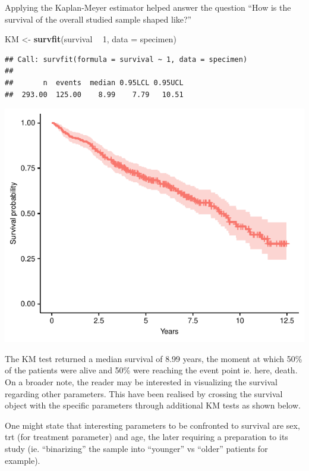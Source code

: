 \documentclass[]{article}
\newenvironment{Shaded}{\begin{snugshade}}{\end{snugshade}}
\newcommand{\KeywordTok}[1]{\textcolor[rgb]{0.13,0.29,0.53}{\textbf{#1}}}
\newcommand{\DataTypeTok}[1]{\textcolor[rgb]{0.13,0.29,0.53}{#1}}
\newcommand{\DecValTok}[1]{\textcolor[rgb]{0.00,0.00,0.81}{#1}}
\newcommand{\StringTok}[1]{\textcolor[rgb]{0.31,0.60,0.02}{#1}}
\newcommand{\OperatorTok}[1]{\textcolor[rgb]{0.81,0.36,0.00}{\textbf{#1}}}
\newcommand{\NormalTok}[1]{#1}
\begin{document}
Applying the Kaplan-Meyer estimator helped answer the question ``How is
the survival of the overall studied sample shaped like?''

\begin{Shaded}
\begin{Highlighting}[]
\NormalTok{KM <-}\StringTok{ }\KeywordTok{survfit}\NormalTok{(survival }\OperatorTok{~}\StringTok{ }\DecValTok{1}\NormalTok{, }\DataTypeTok{data =}\NormalTok{ specimen)}
\end{Highlighting}
\end{Shaded}

\begin{verbatim}
## Call: survfit(formula = survival ~ 1, data = specimen)
## 
##       n  events  median 0.95LCL 0.95UCL 
##  293.00  125.00    8.99    7.79   10.51
\end{verbatim}

\includegraphics{survival_pbc_files/figure-latex/unnamed-chunk-13-1.pdf}

The KM test returned a median survival of 8.99 years, the moment at
which 50\% of the patients were alive and 50\% were reaching the event
point ie. here, death. On a broader note, the reader may be interested
in visualizing the survival regarding other parameters. This have been
realised by crossing the survival object with the specific parameters
through additional KM tests as shown below.

One might state that interesting parameters to be confronted to survival
are sex, trt (for treatment parameter) and age, the later requiring a
preparation to its study (ie. ``binarizing'' the sample into ``younger''
vs ``older'' patients for example).
\end{document}
